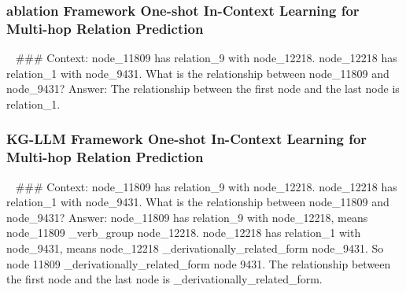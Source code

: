 \documentclass[pmlr]{jmlr}%
\begin{document}
\subsubsection{ablation Framework One-shot In-Context Learning for Multi-hop Relation Prediction}
\ 
\#\#\# Context:\newline
node\_11809 has relation\_9 with node\_12218. node\_12218 has relation\_1 with node\_9431. What is the relationship between node\_11809 and node\_9431?\newline
Answer:\newline
The relationship between the first node and the last node is relation\_1.

\subsubsection{KG-LLM Framework One-shot In-Context Learning for Multi-hop Relation Prediction}
\ 
\#\#\# Context:\newline
node\_11809 has relation\_9 with node\_12218. node\_12218 has relation\_1 with node\_9431. What is the relationship between node\_11809 and node\_9431?\newline
Answer:\newline
node\_11809 has relation\_9 with node\_12218, means node\_11809 \_verb\_group node\_12218. node\_12218 has relation\_1 with node\_9431, means node\_12218 \_derivationally\_related\_form node\_9431. So node 11809 \_derivationally\_related\_form node 9431. The relationship between the first node and the last node is \_derivationally\_related\_form.



 
\end{document}
